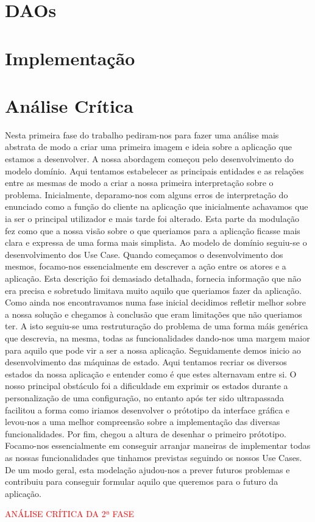 \documentclass[11pt]{article} %
\begin{document}
\section{DAOs}

\section{Implementação}


\section{Análise Crítica}
Nesta primeira fase do trabalho pediram-nos para fazer uma análise mais abstrata de modo a criar uma primeira imagem e ideia sobre a aplicação que estamos a desenvolver. A nossa abordagem começou pelo desenvolvimento do modelo domínio. Aqui tentamos estabelecer as principais entidades e as relações entre as mesmas de modo a criar a nossa primeira interpretação sobre o problema. Inicialmente, deparamo-nos com alguns erros de interpretação do enunciado como a função do cliente na aplicação que inicialmente achavamos que ia ser o principal utilizador e mais tarde foi alterado. Esta parte da modulação fez como que a nossa visão sobre o que queriamos para a aplicação ficasse mais clara e expressa de uma forma mais simplista. Ao modelo de domínio seguiu-se o desenvolvimento dos Use Case. Quando começamos o desenvolvimento dos mesmos, focamo-nos essencialmente em descrever a ação entre os atores e a aplicação. Esta descrição foi demasiado detalhada, fornecia informação que não era precisa e sobretudo limitava muito aquilo que queriamos fazer da aplicação. Como ainda nos encontravamos numa fase inicial decidimos refletir melhor sobre a nossa solução e chegamos à conclusão que eram limitações que não queriamos ter. A isto seguiu-se uma restruturação do problema de uma forma máis genérica que descrevia, na mesma, todas as funcionalidades dando-nos uma margem maior para aquilo que pode vir a ser a nossa aplicação.
Seguidamente demos inicio ao desenvolvimento das máquinas de estado. Aqui tentamos recriar os diversos estados da nossa aplicação e entender como é que estes alternavam entre si. O nosso principal obstáculo foi a dificuldade em exprimir os estados durante a personalização de uma configuração, no entanto após ter sido ultrapassada facilitou a forma como iriamos desenvolver o prótotipo da interface gráfica e levou-nos a uma melhor compreensão sobre a implementação das diversas funcionalidades. Por fim, chegou a altura de desenhar o primeiro prótotipo. Focamo-nos essencialmente em conseguir arranjar maneiras de implementar todas as nossas funcionalidades que tinhamos previstas seguindo os nossos Use Cases. De um modo geral, esta modelação ajudou-nos a prever futuros problemas e contribuiu para conseguir formular aquilo que queremos para o futuro da aplicação.

\textcolor{red}{ANÁLISE CRÍTICA DA 2ª FASE}
\end{document}
